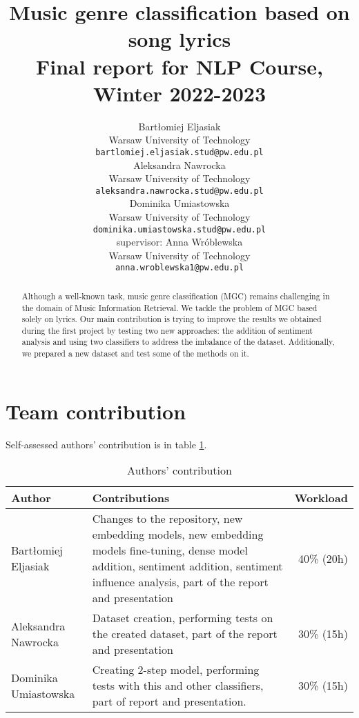 \documentclass[11pt]{article}
\title{Music genre classification based on song lyrics \\Final report for NLP Course, Winter 2022-2023}
\author{Bartłomiej Eljasiak \\
  Warsaw University of Technology \\
  {\tt\small bartlomiej.eljasiak.stud@pw.edu.pl} \\\And
  Aleksandra Nawrocka \\
  Warsaw University of Technology \\
  {\tt\small aleksandra.nawrocka.stud@pw.edu.pl} \\
  \AND
  Dominika Umiastowska \\
  Warsaw University of Technology \\
  {\tt\small dominika.umiastowska.stud@pw.edu.pl} \\\And 
  supervisor: Anna Wróblewska\\
  Warsaw University of Technology \\
  {\tt\small anna.wroblewska1@pw.edu.pl}\\}
\date{}
\begin{document}
\raggedbottom

\maketitle

\vspace{5em}

\begin{abstract}

Although a well-known task, music genre classification (MGC) remains challenging in the domain of Music Information Retrieval. We tackle the problem of MGC based solely on lyrics. Our main contribution is trying to improve the results we obtained during the first project by testing two new approaches: the addition of sentiment analysis and using two classifiers to address the imbalance of the dataset. Additionally, we prepared a new dataset and test some of the methods on it.

\end{abstract}















\section{Team contribution}
Self-assessed authors' contribution is in table \ref{tab:contribution}.

\begin{table}[h]
\centering
\begin{tabularx}{0.5\textwidth}{XXr}
\textbf{Author} & \textbf{Contributions} & \textbf{Workload} \\\hline
Bartłomiej \mbox{Eljasiak} & Changes to the repository, new embedding models, new embedding models fine-tuning, dense model addition, sentiment addition, sentiment influence analysis,  part of the report and presentation & 40\% (20h)\\\hline
Aleksandra Nawrocka & Dataset creation, performing tests on the created dataset, part of the report and presentation & 30\% (15h) \\\hline
Dominika \mbox{Umiastowska} &  Creating 2-step model, performing tests with this and other classifiers, part of report and presentation. & 30\% (15h) \\
\end{tabularx}
\caption{Authors' contribution}
\label{tab:contribution}
\end{table}

\printbibliography
\end{document}
